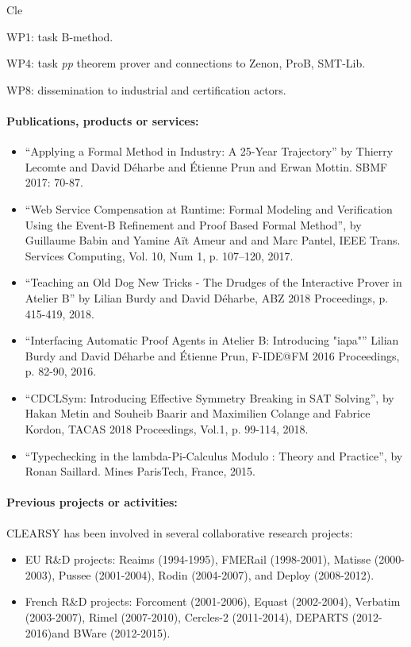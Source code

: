 \begin{sitedescription}{Cle}
\begin{compactitem}
\item WP1: task B-method.
\item WP4: task \emph{pp} theorem prover and connections to Zenon, ProB, SMT-Lib.
\item WP8: dissemination to industrial and certification actors.
\end{compactitem}


\paragraph{Publications, products or services:}

\begin{itemize}
\item ``Applying a Formal Method in Industry: A 25-Year Trajectory'' by Thierry Lecomte and David Déharbe and Étienne Prun and Erwan Mottin.
SBMF 2017: 70-87.
\item ``Web Service Compensation at Runtime: Formal Modeling and Verification Using the Event-B Refinement and Proof Based Formal Method'', by Guillaume Babin and Yamine Aït Ameur and and Marc Pantel, IEEE Trans. Services Computing, Vol. 10, Num 1, p. 107--120, 2017.
\item ``Teaching an Old Dog New Tricks - The Drudges of the Interactive Prover in Atelier B'' by Lilian Burdy and David Déharbe, ABZ 2018 Proceedings, p. 415-419, 2018.
\item ``Interfacing Automatic Proof Agents in Atelier B: Introducing "iapa"'' Lilian Burdy and David Déharbe and Étienne Prun, F-IDE@FM 2016 Proceedings, p. 82-90, 2016.
\item ``CDCLSym: Introducing Effective Symmetry Breaking in SAT Solving'', by Hakan Metin and Souheib Baarir and Maximilien Colange and Fabrice Kordon, TACAS 2018 Proceedings, Vol.1, p. 99-114, 2018.
\item ``Typechecking in the lambda-Pi-Calculus Modulo : Theory and Practice'', by Ronan Saillard. Mines ParisTech, France, 2015.
\end{itemize}

\paragraph{Previous projects or activities:}

CLEARSY has been involved in several collaborative research projects:
\begin{itemize}
\item EU R\&D projects: Reaims (1994-1995), FMERail (1998-2001), Matisse (2000-2003), Pussee (2001-2004), Rodin (2004-2007), and Deploy (2008-2012).
\item French R\&D projects: Forcoment (2001-2006), Equast (2002-2004), Verbatim (2003-2007), Rimel (2007-2010), Cercles-2 (2011-2014), DEPARTS (2012-2016)and BWare (2012-2015).
\end{itemize}


\end{sitedescription}
